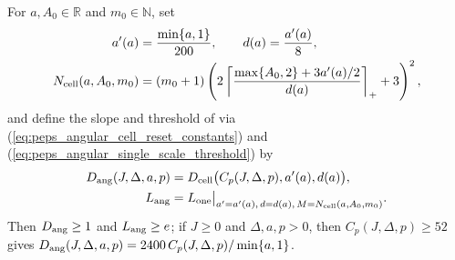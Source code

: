 \begin{definition}
    \label{def:peps_angular_information_constants}
    \leanok
    For $a,A_0\in\mathbb R$ and $m_0\in\mathbb N$, set
    \begin{align}
        a'(a)                   & =\frac{\min\{a,1\}}{200}, \qquad d(a)=\frac{a'(a)}8, \notag \\
        N_{\rm cell}(a,A_0,m_0) & =(m_0+1)\left(2\left\lceil
        \frac{\max\{A_0,2\}+3a'(a)/2}{d(a)}\right\rceil_++3\right)^2,
        \notag
    \end{align}
    and define the slope and threshold of \cite[Proposition~3.4]{OpenAI2026PolynomialPEPS} via (\ref{eq:peps_angular_cell_reset_constants}) and (\ref{eq:peps_angular_single_scale_threshold}) by
    \begin{align}
        D_{\rm ang}(J,\Delta,a,p) & =D_{\rm cell}\bigl(C_p(J,\Delta,p),a'(a),d(a)\bigr),
        \notag                                                                                         \\
        L_{\rm ang}               & =L_{\rm one}\big|_{a'=a'(a),\,d=d(a),\,M=N_{\rm cell}(a,A_0,m_0)}.
        \label{eq:peps_angular_information_constants}
    \end{align}
    Then $D_{\rm ang}\ge1$ and $L_{\rm ang}\ge e$; if $J\ge0$ and $\Delta,a,p>0$, then $C_p(J,\Delta,p)\ge52$ gives
    $D_{\rm ang}(J,\Delta,a,p)=2400\,C_p(J,\Delta,p)/\min\{a,1\}$.
\end{definition}

